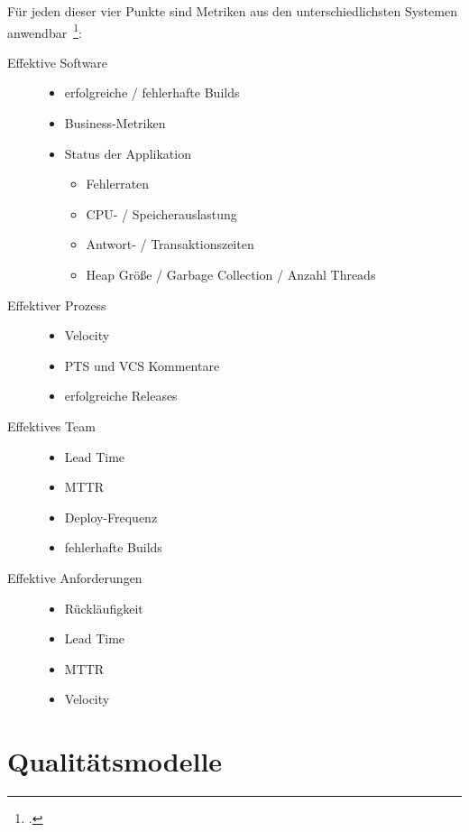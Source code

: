 Für jeden dieser vier Punkte sind Metriken aus den unterschiedlichsten Systemen anwendbar~\footcite[vgl.][S.219ff]{davis_agile_2015}:

\clearpage
\begin{description}
  \item[Effektive Software] \hfill
  \begin{itemize}[noitemsep]
    \item erfolgreiche / fehlerhafte Builds
    \item Business-Metriken
    \item Status der Applikation
    \begin{itemize}[noitemsep]
      \item Fehlerraten
      \item CPU- / Speicherauslastung
      \item Antwort- / Transaktionszeiten
      \item Heap Größe / Garbage Collection / Anzahl Threads
    \end{itemize}
  \end{itemize}
  \item[Effektiver Prozess] \hfill
  \begin{itemize}[noitemsep]
    \item Velocity
    \item \ac{PTS} und \ac{VCS} Kommentare
    \item erfolgreiche Releases
  \end{itemize}
  \item[Effektives Team] \hfill
  \begin{itemize}[noitemsep]
    \item Lead Time
    \item \ac{MTTR}
    \item Deploy-Frequenz
    \item fehlerhafte Builds
  \end{itemize}
  \item[Effektive Anforderungen] \hfill
  \begin{itemize}[noitemsep]
    \item Rückläufigkeit
    \item Lead Time
    \item \ac{MTTR}
    \item Velocity
  \end{itemize}
\end{description}

\clearpage
\section{Qualitätsmodelle}

